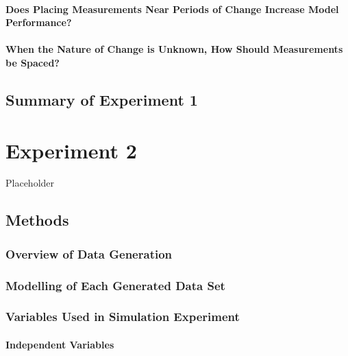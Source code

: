 \documentclass[
12pt, %
twoside,
english]{guelphthesis}
\begin{document}
\hypertarget{meas-placing}{%
\subsubsection{Does Placing Measurements Near Periods of Change Increase Model Performance?}\label{meas-placing}}

\hypertarget{unknown}{%
\subsubsection{When the Nature of Change is Unknown, How Should Measurements be Spaced?}\label{unknown}}

\hypertarget{summary-of-experiment-1}{%
\section{Summary of Experiment 1}\label{summary-of-experiment-1}}

\hypertarget{Exp2}{%
\chapter{Experiment 2}\label{Exp2}}

Placeholder

\hypertarget{methods-1}{%
\section{Methods}\label{methods-1}}

\hypertarget{overview-of-data-generation}{%
\subsection{Overview of Data Generation}\label{overview-of-data-generation}}

\hypertarget{data-modelling-exp2}{%
\subsection{Modelling of Each Generated Data Set}\label{data-modelling-exp2}}

\hypertarget{variables-used-in-simulation-experiment-1}{%
\subsection{Variables Used in Simulation Experiment}\label{variables-used-in-simulation-experiment-1}}

\hypertarget{independent-variables-1}{%
\subsubsection{Independent Variables}\label{independent-variables-1}}
\end{document}
